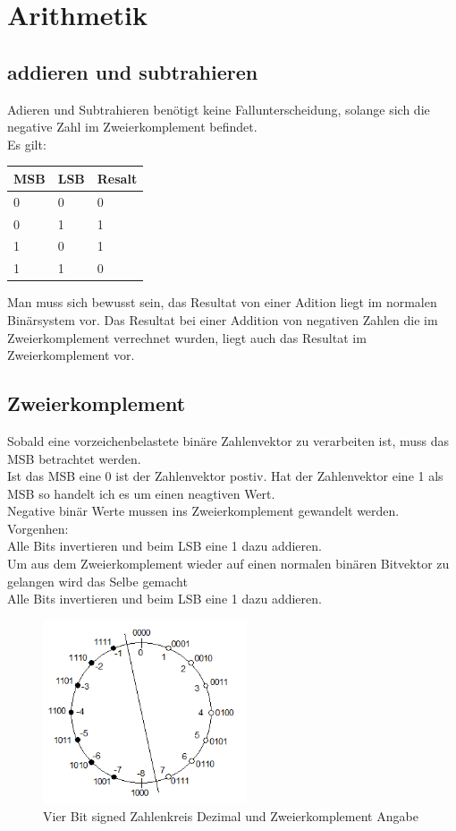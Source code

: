 \section{Arithmetik}
\subsection{addieren und subtrahieren}
Adieren und Subtrahieren benötigt keine Fallunterscheidung, solange sich die 
negative Zahl im Zweierkomplement befindet.\\
Es gilt:\\
\begin{table}[h]
\begin{tabular}{ll|l}

MSB & LSB & Resalt \\ \hline
0   & 0   & 0      \\ 
0   & 1   & 1      \\ 
1   & 0   & 1      \\ 
1   & 1   & 0      \\ 
\end{tabular}
\end{table}

\noindent Man muss sich bewusst sein, das Resultat von einer Adition liegt im 
normalen Binärsystem vor. Das Resultat bei einer Addition von negativen Zahlen 
die im Zweierkomplement verrechnet wurden, liegt auch das Resultat im 
Zweierkomplement vor.

\subsection{Zweierkomplement}
Sobald eine vorzeichenbelastete binäre Zahlenvektor zu verarbeiten ist, muss 
das MSB betrachtet werden.\\
Ist das MSB eine 0 ist der Zahlenvektor postiv. Hat der Zahlenvektor eine 1 
als MSB so handelt ich es um einen neagtiven Wert.
\\
Negative binär Werte mussen ins Zweierkomplement gewandelt werden.\\
Vorgenhen:\\
Alle Bits invertieren und beim LSB eine 1 dazu addieren.
\\
Um aus dem Zweierkomplement wieder auf einen normalen binären Bitvektor zu 
gelangen wird das Selbe gemacht\\
Alle Bits invertieren und beim LSB eine 1 dazu addieren.
\begin{figure}[htbp]
	\centering
		\includegraphics[width=6cm]{content/bilder/Zahlenkreis.png}
	\caption{Vier Bit signed Zahlenkreis Dezimal und Zweierkomplement Angabe}%
	\label{Zahlenkreis}
\end{figure}

